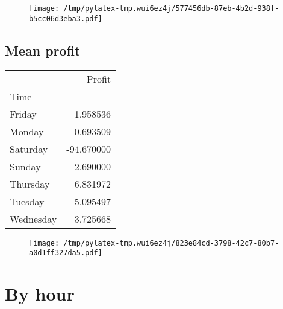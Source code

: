 \documentclass{article}%
\begin{document}
\begin{figure}[htbp]%
\centering%
\texttt{[image: /tmp/pylatex-tmp.wui6ez4j/577456db-87eb-4b2d-938f-b5cc06d3eba3.pdf]}%
\end{figure}

%
\newpage %
\subsection{Mean profit }%
\label{subsec:Meanprofit}%
\begin{tabular}{lr}
\toprule
{} &     Profit \\
Time      &            \\
\midrule
Friday    &   1.958536 \\
Monday    &   0.693509 \\
Saturday  & -94.670000 \\
Sunday    &   2.690000 \\
Thursday  &   6.831972 \\
Tuesday   &   5.095497 \\
Wednesday &   3.725668 \\
\bottomrule
\end{tabular}
%


\begin{figure}[htbp]%
\centering%
\texttt{[image: /tmp/pylatex-tmp.wui6ez4j/823e84cd-3798-42c7-80b7-a0d1ff327da5.pdf]}%
\end{figure}

%
\newpage %
\section{By hour}%
\label{sec:Byhour}%
\end{document}
